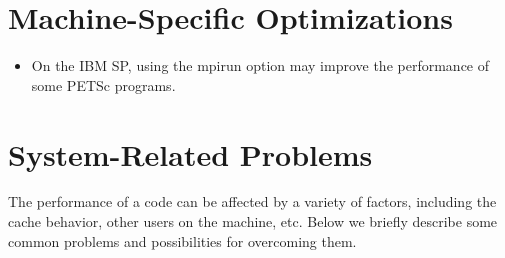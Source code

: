 \section{Machine-Specific Optimizations}

\begin{itemize}
\item On the IBM SP, using the mpirun option  may
      improve the performance of some PETSc programs.
\end{itemize}

\section{System-Related Problems}

The performance of a code can be affected by a variety of factors, 
including the cache behavior, other users on the machine, etc.
Below we briefly describe some common problems and possibilities for
overcoming them.

